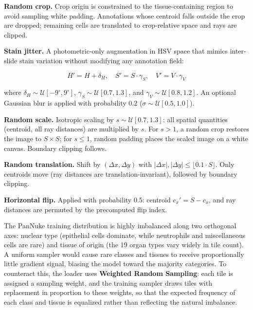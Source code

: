 \textbf{Random crop.} Crop origin is constrained to the tissue-containing region to avoid sampling white padding. Annotations whose centroid falls outside the crop are dropped; remaining cells are translated to crop-relative space and rays are clipped.

\textbf{Stain jitter.} A photometric-only augmentation in HSV space that mimics inter-slide stain variation without modifying any annotation field:

\begin{equation}
    H' = H + \delta_H,\quad S' = S \cdot \gamma_S,\quad V' = V \cdot \gamma_V
\end{equation}

where $\delta_H \sim \mathcal{U}[-9^\circ, 9^\circ]$, $\gamma_S \sim \mathcal{U}[0.7, 1.3]$, and $\gamma_V \sim \mathcal{U}[0.8, 1.2]$. An optional Gaussian blur is applied with probability 0.2 ($\sigma \sim \mathcal{U}[0.5, 1.0]$).

\textbf{Random scale.} Isotropic scaling by $s \sim \mathcal{U}[0.7, 1.3]$: all spatial quantities (centroid, all ray distances) are multiplied by $s$. For $s > 1$, a random crop restores the image to $S \times S$; for $s \leq 1$, random padding places the scaled image on a white canvas. Boundary clipping follows.

\textbf{Random translation.} Shift by $(\Delta x, \Delta y)$ with $|\Delta x|, |\Delta y| \leq \lfloor 0.1 \cdot S \rfloor$. Only centroids move (ray distances are translation-invariant), followed by boundary clipping.

\textbf{Horizontal flip.} Applied with probability 0.5: centroid $c_x' = S - c_x$, and ray distances are permuted by the precomputed flip index.

\label{sec:weighted-sampling}

The PanNuke training distribution is highly imbalanced along two orthogonal axes: nuclear type (epithelial cells dominate, while neutrophils and miscellaneous cells are rare) and tissue of origin (the 19 organ types vary widely in tile count). A uniform sampler would cause rare classes and tissues to receive proportionally little gradient signal, biasing the model toward the majority categories. To counteract this, the loader uses \textbf{Weighted Random Sampling}: each tile is assigned a sampling weight, and the training sampler draws tiles with replacement in proportion to these weights, so that the expected frequency of each class and tissue is equalized rather than reflecting the natural imbalance.

